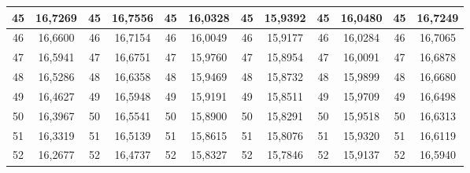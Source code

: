 \documentclass[a4paper,12pt]{article} %
\begin{document}
\begin{longtable}[c]{cccccccccc|c|c|}
	\multicolumn{1}{|c|}{45} & \multicolumn{1}{c|}{16,7269} & \multicolumn{1}{c|}{45} & \multicolumn{1}{c|}{16,7556} & \multicolumn{1}{c|}{45} & \multicolumn{1}{c|}{16,0328} & \multicolumn{1}{c|}{45} & \multicolumn{1}{c|}{15,9392} & \multicolumn{1}{c|}{45} & 16,0480 & 45 & 16,7249 \\ \hline
	\multicolumn{1}{|c|}{46} & \multicolumn{1}{c|}{16,6600} & \multicolumn{1}{c|}{46} & \multicolumn{1}{c|}{16,7154} & \multicolumn{1}{c|}{46} & \multicolumn{1}{c|}{16,0049} & \multicolumn{1}{c|}{46} & \multicolumn{1}{c|}{15,9177} & \multicolumn{1}{c|}{46} & 16,0284 & 46 & 16,7065 \\ \hline
	\multicolumn{1}{|c|}{47} & \multicolumn{1}{c|}{16,5941} & \multicolumn{1}{c|}{47} & \multicolumn{1}{c|}{16,6751} & \multicolumn{1}{c|}{47} & \multicolumn{1}{c|}{15,9760} & \multicolumn{1}{c|}{47} & \multicolumn{1}{c|}{15,8954} & \multicolumn{1}{c|}{47} & 16,0091 & 47 & 16,6878 \\ \hline
	\multicolumn{1}{|c|}{48} & \multicolumn{1}{c|}{16,5286} & \multicolumn{1}{c|}{48} & \multicolumn{1}{c|}{16,6358} & \multicolumn{1}{c|}{48} & \multicolumn{1}{c|}{15,9469} & \multicolumn{1}{c|}{48} & \multicolumn{1}{c|}{15,8732} & \multicolumn{1}{c|}{48} & 15,9899 & 48 & 16,6680 \\ \hline
	\multicolumn{1}{|c|}{49} & \multicolumn{1}{c|}{16,4627} & \multicolumn{1}{c|}{49} & \multicolumn{1}{c|}{16,5948} & \multicolumn{1}{c|}{49} & \multicolumn{1}{c|}{15,9191} & \multicolumn{1}{c|}{49} & \multicolumn{1}{c|}{15,8511} & \multicolumn{1}{c|}{49} & 15,9709 & 49 & 16,6498 \\ \hline
	\multicolumn{1}{|c|}{50} & \multicolumn{1}{c|}{16,3967} & \multicolumn{1}{c|}{50} & \multicolumn{1}{c|}{16,5541} & \multicolumn{1}{c|}{50} & \multicolumn{1}{c|}{15,8900} & \multicolumn{1}{c|}{50} & \multicolumn{1}{c|}{15,8291} & \multicolumn{1}{c|}{50} & 15,9518 & 50 & 16,6313 \\ \hline
	\multicolumn{1}{|c|}{51} & \multicolumn{1}{c|}{16,3319} & \multicolumn{1}{c|}{51} & \multicolumn{1}{c|}{16,5139} & \multicolumn{1}{c|}{51} & \multicolumn{1}{c|}{15,8615} & \multicolumn{1}{c|}{51} & \multicolumn{1}{c|}{15,8076} & \multicolumn{1}{c|}{51} & 15,9320 & 51 & 16,6119 \\ \hline
	\multicolumn{1}{|c|}{52} & \multicolumn{1}{c|}{16,2677} & \multicolumn{1}{c|}{52} & \multicolumn{1}{c|}{16,4737} & \multicolumn{1}{c|}{52} & \multicolumn{1}{c|}{15,8327} & \multicolumn{1}{c|}{52} & \multicolumn{1}{c|}{15,7846} & \multicolumn{1}{c|}{52} & 15,9137 & 52 & 16,5940 \\ \hline

\end{longtable}
\end{document}

